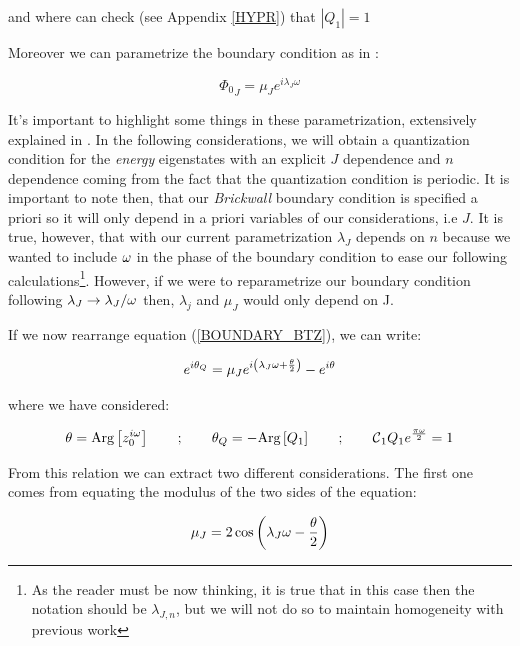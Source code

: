 \documentclass[11pt,a4paper]{article}
\begin{document}
{\noindent and where can check (see Appendix \ref{HYPR}) that $\left|Q_1\right|=1$

Moreover we can parametrize the boundary condition as in \cite{Jeong_2025,Das_2023,das2023fuzzballsrandommatrices}:

\begin{equation}
    {\Phi_0}_J = \mu_J e^{i\lambda_J\omega}
\end{equation}

It's important to highlight some things in these parametrization, extensively explained in \cite{das2023fuzzballsrandommatrices}. In the following considerations, we will obtain a quantization condition for the \textit{energy} eigenstates with an explicit $J$ dependence and $n$ dependence coming from the fact that the quantization condition is periodic. It is important to note then, that our \textit{Brickwall} boundary condition is specified a priori so it will only depend in a priori variables of our considerations, i.e $J$. It is true, however, that with our current parametrization $\lambda_J$ depends on $n$ because we wanted to include $\omega$ in the phase of the boundary condition to ease our following calculations\footnote{As the reader must be now thinking, it is true that in this case then the notation should be $\lambda_{J,n}$, but we will not do so to maintain homogeneity with previous work}. However, if we were to reparametrize our boundary condition following $\lambda_J \rightarrow \lambda_J/\omega$ then, $\lambda_j$ and $\mu_J$ would only depend on J.

If we now rearrange equation (\ref{BOUNDARY_BTZ}), we can write:

\begin{equation}\LA{QUANTIZATION_BTZ}
    e^{i\theta_Q} = \mu_J e^{i\left(\lambda_J\w + \frac{\theta}{2}\right)} - e^{i\theta}
\end{equation}

{\noindent where we have considered:}

\begin{equation}
    \theta = \text{Arg}\left[z_0^{i\omega}\right] ~~~~~~;~~~~~~\theta_Q = -\text{Arg}\left[Q_1\right] ~~~~~~;~~~~~~ \mbox{${\cal C}$}_1Q_1e^{\frac{\pi\omega}{2}}=1
\end{equation}

From this relation we can extract two different considerations. The first one comes from equating the modulus of the two sides of the equation:

\begin{equation}\LA{MODULUS_BTZ}
    \mu_J = 2\cos\left(\lambda_J\w - \frac{\theta}{2}\right)
\end{equation}

}
\end{document}
